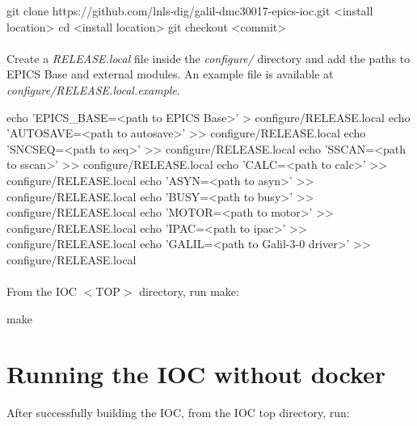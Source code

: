 \documentclass[openany]{article}
\begin{document}
            \vspace{1mm}
            \begin{code}
git clone https://github.com/lnls-dig/galil-dmc30017-epics-ioc.git <install location>
cd <install location>
git checkout <commit>
            \end{code}
            \vspace{1mm}

        \paragraph{} Create a \emph{RELEASE.local} file inside the \emph{configure/} directory and add the paths to EPICS Base and external modules. An example file is available at \emph{configure/RELEASE.local.example}.

            \vspace{1mm}
            \begin{code}
echo 'EPICS_BASE=<path to EPICS Base>' > configure/RELEASE.local
echo 'AUTOSAVE=<path to autosave>' >> configure/RELEASE.local
echo 'SNCSEQ=<path to seq>' >> configure/RELEASE.local
echo 'SSCAN=<path to sscan>' >> configure/RELEASE.local
echo 'CALC=<path to calc>' >> configure/RELEASE.local
echo 'ASYN=<path to asyn>' >> configure/RELEASE.local
echo 'BUSY=<path to busy>' >> configure/RELEASE.local
echo 'MOTOR=<path to motor>' >> configure/RELEASE.local
echo 'IPAC=<path to ipac>' >> configure/RELEASE.local
echo 'GALIL=<path to Galil-3-0 driver>' >> configure/RELEASE.local
            \end{code}
            \vspace{1mm}

        \paragraph{} From the IOC $<$TOP$>$ directory, run make:

            \vspace{1mm}
            \begin{code}
make
            \end{code}
            \vspace{1mm}

\section{Running the IOC without docker}

    After successfully building the IOC, from the IOC top directory, run:
\end{document}
